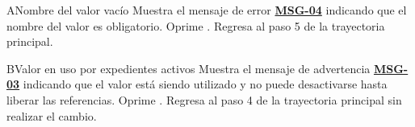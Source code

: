 \begin{UCtrayectoriaA}{A}{Nombre del valor vacío}
	\UCpaso Muestra el mensaje de error \hyperlink{mMSG04}{\bf MSG-04} indicando que el nombre del valor es obligatorio.
	\UCpaso[\UCactor] Oprime .
	\UCpaso Regresa al paso 5 de la trayectoria principal.
\end{UCtrayectoriaA}

\begin{UCtrayectoriaA}{B}{Valor en uso por expedientes activos}
	\UCpaso Muestra el mensaje de advertencia \hyperlink{mMSG03}{\bf MSG-03} indicando que el valor está siendo utilizado y no puede desactivarse hasta liberar las referencias.
	\UCpaso[\UCactor] Oprime .
	\UCpaso Regresa al paso 4 de la trayectoria principal sin realizar el cambio.
\end{UCtrayectoriaA}


